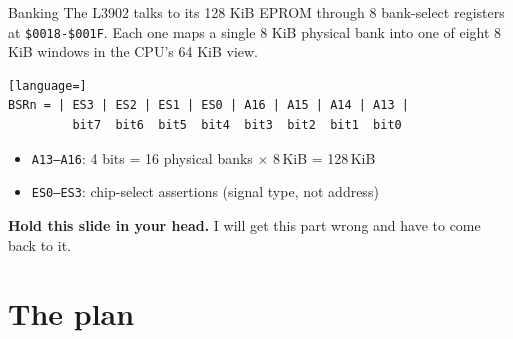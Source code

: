\documentclass[aspectratio=169,11pt]{beamer}
\begin{document}
\begin{frame}[fragile]{Banking}
The L3902 talks to its 128 KiB EPROM through 8 bank-select registers
at \texttt{\$0018-\$001F}. Each one maps a single 8 KiB physical bank
into one of eight 8 KiB windows in the CPU's 64 KiB view.
\vspace{1em}

\begin{lstlisting}[language=]
BSRn = | ES3 | ES2 | ES1 | ES0 | A16 | A15 | A14 | A13 |
         bit7  bit6  bit5  bit4  bit3  bit2  bit1  bit0
\end{lstlisting}

\vspace{0.4em}
\begin{itemize}
  \item \texttt{A13--A16}: 4 bits = 16 physical banks $\times$ 8\,KiB = 128\,KiB
  \item \texttt{ES0--ES3}: chip-select assertions (signal type, not address)
\end{itemize}
\vspace{0.3em}
\textbf{Hold this slide in your head.} I will get this part wrong and
have to come back to it.
\end{frame}

\section{The plan}
\end{document}
